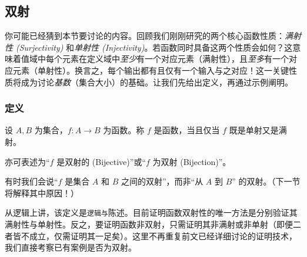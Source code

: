 
\subsection{双射}

你可能已经猜到本节要讨论的内容。回顾我们刚刚研究的两个核心函数性质：\emph{满射性 (Surjectivity)} 和\emph{单射性 (Injectivity)}。若函数同时具备这两个性质会如何？这意味着值域中每个元素在定义域中\emph{至少}有一个对应元素（满射性），且\emph{至多}有一个对应元素（单射性）。换言之，每个输出都有且仅有一个输入与之对应！这一关键性质将成为讨论\emph{基数}（集合大小）的基础。让我们先给出定义，再通过示例阐明。

\subsubsection*{定义}

\begin{definition}
    设 $A, B$ 为集合，$f: A \to B$ 为函数。称 $f$ 是函数，当且仅当 $f$ 既是单射又是满射。

    亦可表述为``$f$ 是双射的 (Bijective)''或``$f$ 为双射 (Bijection)''。

    有时我们会说``$f$ 是集合 $A$ 和 $B$ 之间的双射''，而非``从 $A$ 到 $B$'' 的双射。（下一节将解释其中原因！）
\end{definition}

从逻辑上讲，该定义是\verb|逻辑与|陈述。目前证明函数双射性的唯一方法是分别验证其满射性与单射性。反之，要证明函数非双射，只需证明其非满射或非单射（即便二者皆不成立，仅需证明其一足矣）。这里不再重复前文已经详细讨论的证明技术，我们直接考察已有案例是否为双射。\\


